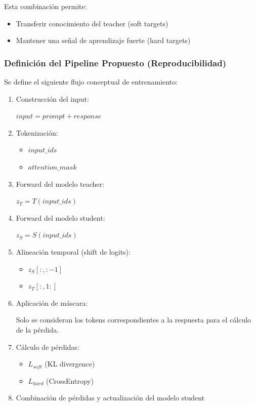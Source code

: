 \documentclass[12pt]{article}
\begin{document}
	Esta combinación permite:
	
	\begin{itemize}
		\item Transferir conocimiento del teacher (soft targets)
		\item Mantener una señal de aprendizaje fuerte (hard targets)
	\end{itemize}
	

	
	\subsubsection{Definición del Pipeline Propuesto (Reproducibilidad)}
	
	Se define el siguiente flujo conceptual de entrenamiento:
	
	\begin{enumerate}
		\item Construcción del input:
		\begin{center}
			$input = prompt + response$
		\end{center}
		
		\item Tokenización:
		\begin{itemize}
			\item $input\_ids$
			\item $attention\_mask$
		\end{itemize}
		
		\item Forward del modelo teacher:
		\begin{center}
			$z_T = T(input\_ids)$
		\end{center}
		
		\item Forward del modelo student:
		\begin{center}
			$z_S = S(input\_ids)$
		\end{center}
		
		\item Alineación temporal (shift de logits):
		
		\begin{itemize}
			\item $z_S[:, :-1]$
			\item $z_T[:, 1:]$
		\end{itemize}
		
		\item Aplicación de máscara:
		
		Solo se consideran los tokens correspondientes a la respuesta para el cálculo de la pérdida.
		
		\item Cálculo de pérdidas:
		
		\begin{itemize}
			\item $L_{soft}$ (KL divergence)
			\item $L_{hard}$ (CrossEntropy)
		\end{itemize}
		
		\item Combinación de pérdidas y actualización del modelo student
	\end{enumerate}
	
\end{document}
